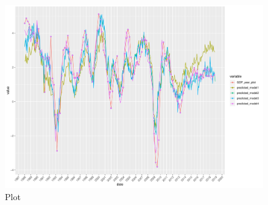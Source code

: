 \documentclass[12pt,a4paper,oneside]{book}
\begin{document}
\begin{figure}[H]
    \centering
    \captionsetup{justification=centering}
    \includegraphics[scale=0.5]{Graphs/pred2.pdf}
    \caption{Plot }
    \label{A_corplot}
\end{figure}


\newpage
\end{document}
